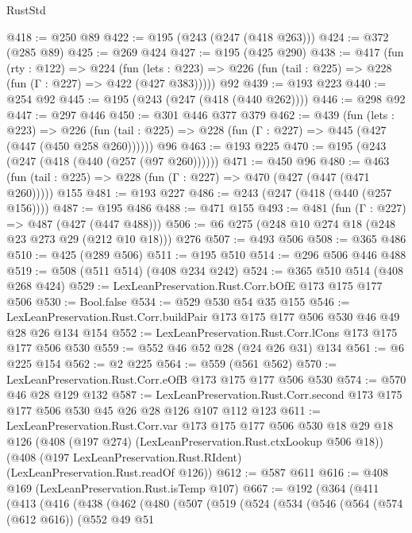 \begin{lexlean}{RustStd}
\begin{coremodule}
{\begin{coremodule}
{{{{{@418 := @250 @89
@422 := @195 (@243 (@247 (@418 @263)))
@424 := @372 (@285 @89)
@425 := @269 @424
@427 := @195 (@425 @290)
@438 := @417
    (fun (rty : @122) =>
    @224
      (fun (lets : @223) => @226 (fun (tail : @225) => @228 (fun (Γ : @227) => @422 (@427 @383)))))
    @92
@439 := @193 @223
@440 := @254 @92
@445 := @195 (@243 (@247 (@418 (@440 @262))))
@446 := @298 @92
@447 := @297 @446
@450 := @301 @446 @377 @379
@462 := @439
    (fun (lets : @223) =>
    @226 (fun (tail : @225) => @228 (fun (Γ : @227) => @445 (@427 (@447 (@450 @258 @260))))))
    @96
@463 := @193 @225
@470 := @195 (@243 (@247 (@418 (@440 (@257 (@97 @260))))))
@471 := @450 @96
@480 := @463 (fun (tail : @225) => @228 (fun (Γ : @227) => @470 (@427 (@447 (@471 @260))))) @155
@481 := @193 @227
@486 := @243 (@247 (@418 (@440 (@257 @156))))
@487 := @195 @486
@488 := @471 @155
@493 := @481 (fun (Γ : @227) => @487 (@427 (@447 @488)))
@506 := @6 @275 (@248 @10 @274 @18 (@248 @23 @273 @29 (@212 @10 @18))) @276
@507 := @493 @506
@508 := @365 @486
@510 := @425 (@289 @506)
@511 := @195 @510
@514 := @296 @506 @446 @488
@519 := @508 (@511 @514) (@408 @234 @242)
@524 := @365 @510 @514 (@408 @268 @424)
@529 := LexLeanPreservation.Rust.Corr.bOfE @173 @175 @177 @506
@530 := Bool.false
@534 := @529 @530 @54 @35 @155
@546 := LexLeanPreservation.Rust.Corr.buildPair @173 @175 @177 @506 @530 @46 @49 @28 @26 @134 @154
@552 := LexLeanPreservation.Rust.Corr.lCons @173 @175 @177 @506 @530
@559 := @552 @46 @52 @28 (@24 @26 @31) @134
@561 := @6 @225 @154
@562 := @2 @225
@564 := @559 (@561 @562)
@570 := LexLeanPreservation.Rust.Corr.eOfB @173 @175 @177 @506 @530
@574 := @570 @46 @28 @129 @132
@587 := LexLeanPreservation.Rust.Corr.second
    @173
    @175
    @177
    @506
    @530
    @45
    @26
    @28
    @126
    @107
    @112
    @123
@611 := LexLeanPreservation.Rust.Corr.var
    @173
    @175
    @177
    @506
    @530
    @18
    @29
    @18
    @126
    (@408 (@197 @274) (LexLeanPreservation.Rust.ctxLookup @506 @18))
    (@408 (@197 LexLeanPreservation.Rust.RIdent) (LexLeanPreservation.Rust.readOf @126))
@612 := @587 @611
@616 := @408 @169 (LexLeanPreservation.Rust.isTemp @107)
@667 := @192
    (@364
      (@411
        (@413
          (@416
            (@438
              (@462
                (@480
                  (@507
                    (@519
                      (@524
                        (@534
                          (@546
                            (@564
                              (@574 (@612 @616))
                              (@552
                                @49
                                @51
}}}}}
\end{coremodule}}
\end{coremodule}
\end{lexlean}
